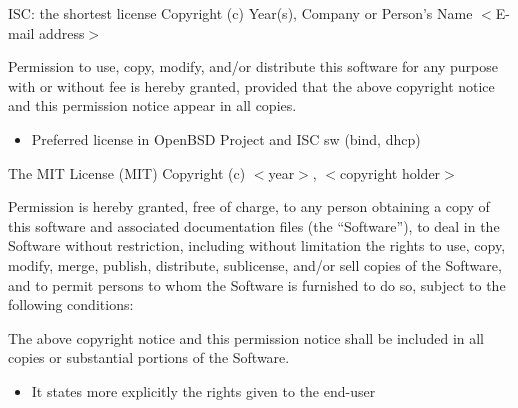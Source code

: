 \documentclass{beamer}
\begin{document}

\begin{frame}

\begin{block}{ISC: the shortest license}
{\small Copyright (c) Year(s), Company or Person's Name $<$E-mail address$>$}

\medskip

\alert{Permission} to \alert{use}, \alert{copy}, \alert{modify}, and/or \alert{distribute} this software for any
purpose with or without fee is hereby granted, provided that the above
copyright notice and this permission notice appear in all copies.
\end{block}

\medskip
\begin{itemize}
\item Preferred license in OpenBSD Project and ISC sw (bind, dhcp)
\end{itemize}
\end{frame}



\begin{frame}

\begin{block}{The MIT License (MIT)} 
Copyright (c) $<$year$>$, $<$copyright holder$>$ 

\medskip

Permission is hereby granted, free of charge, to any person obtaining a copy of this software and associated documentation files (the ``Software''), to deal in the Software without restriction, including without limitation the rights to \alert{use}, \alert{copy}, \alert{modify}, \alert{merge}, \alert{publish}, \alert{distribute}, sublicense, \alert{and/or sell copies} of the Software, and to permit persons to whom the Software is furnished to do so, subject to the following conditions:

\medskip

The above copyright notice and this permission notice shall be included in all copies or substantial portions of the Software.
 
\end{block}
\medskip
\begin{itemize}
\item It states more explicitly the rights given to the end-user
\end{itemize}

\end{frame}
\end{document}
